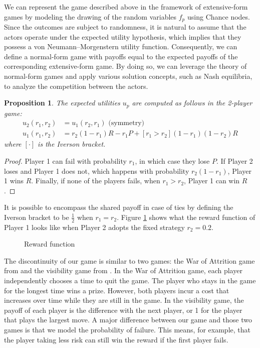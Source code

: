 \documentclass[preprint,12pt,authoryear]{elsarticle}
\newtheorem{proposition}[theorem]{Proposition}
\theoremstyle{definition}
\begin{document}
We can represent the game described above in the framework of extensive-form games\citep{hart1992games} by modeling the drawing of the random variables $f_p$ using Chance nodes. Since the outcomes are subject to randomness, it is natural to assume that the actors operate under the expected utility hypothesis, which implies that they possess a von Neumann–Morgenstern utility function\citep{neumann1944theory}. Consequently, we can define a normal-form game with payoffs equal to the expected payoffs of the corresponding extensive-form game. By doing so, we can leverage the theory of normal-form games and apply various solution concepts, such as Nash equilibria, to analyze the competition between the actors.
\begin{proposition}
The expected utilities $u_p$ are computed as follows in the 2-player game:
\begin{align*}
    u_2(r_1, r_2) &= u_1(r_2, r_1) \text{~(symmetry)}\\
    u_1(r_1, r_2) &= r_2 (1-r_1) R - r_1 P + [ r_1 > r_2 ] (1-r_1)(1-r_2) R
\end{align*}
where $[ \cdot ]$ is the Iverson bracket.
\end{proposition}
\begin{proof}
Player 1 can fail with probability $r_1$, in which case they lose $P$. If Player 2 loses and Player 1 does not, which happens with probability $r_2(1-r_1)$, Player 1 wins $R$. Finally, if none of the players fails, when $r_1 > r_2$, Player 1 can win $R$.
\end{proof}

It is possible to encompass the shared payoff in case of ties by defining the Iverson bracket to be $\frac{1}{2}$ when $r_1 = r_2$.
Figure \ref{fig:reward} shows what the reward function of Player 1 looks like when Player 2 adopts the fixed strategy $r_2=0.2$.

\begin{figure}[htbp]
    \centering
    
    \caption{Reward function}
    \label{fig:reward}
\end{figure}


The discontinuity of our game is similar to two games: the War of Attrition game from \cite{smith1974theory} and the visibility game from \cite{Lotker2008-tx}. In the War of Attrition game, each player independently chooses a time to quit the game. The player who stays in the game for the longest time wins a prize. However, both players incur a cost that increases over time while they are still in the game. In the visibility game, the payoff of each player is the difference with the next player, or 1 for the player that plays the largest move. A major difference between our game and those two games is that we model the probability of failure. This means, for example, that the player taking less risk can still win the reward if the first player fails.
\end{document}
